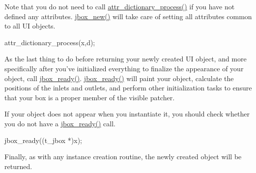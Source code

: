 Note that you do not need to call \hyperlink{group__attr_ga3109d643addc97cb6a07785a9170e2e3}{attr\_\-dictionary\_\-process()} if you have not defined any attributes. \hyperlink{group__jbox_gaaa460d02ca3d22c54368ade59d8e330b}{jbox\_\-new()} will take care of setting all attributes common to all UI objects.


\begin{DoxyCode}
        attr_dictionary_process(x,d);
\end{DoxyCode}


As the last thing to do before returning your newly created UI object, and more specifically after you've initialized everything to finalize the appearance of your object, call \hyperlink{group__jbox_gabea75e4d5243003070cb2de04b81d3d1}{jbox\_\-ready()}. \hyperlink{group__jbox_gabea75e4d5243003070cb2de04b81d3d1}{jbox\_\-ready()} will paint your object, calculate the positions of the inlets and outlets, and perform other initialization tasks to ensure that your box is a proper member of the visible patcher.

If your object does not appear when you instantiate it, you should check whether you do not have a \hyperlink{group__jbox_gabea75e4d5243003070cb2de04b81d3d1}{jbox\_\-ready()} call.


\begin{DoxyCode}
        jbox_ready((t_jbox *)x);
\end{DoxyCode}


Finally, as with any instance creation routine, the newly created object will be returned.



